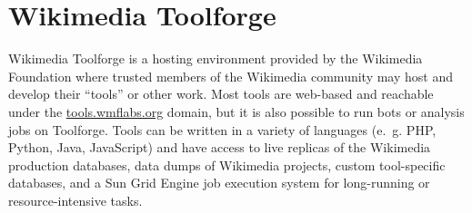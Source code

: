 \section{Wikimedia Toolforge}
\label{sec:Background:Toolforge}

Wikimedia Toolforge is a hosting environment provided by the Wikimedia Foundation
where trusted members of the \gls{Wikimedia} community may host and develop their “tools” or other work.
Most tools are web-based and reachable under the \href{https://tools.wmflabs.org/}{tools.wmflabs.org} domain,
but it is also possible to run bots or analysis jobs on Toolforge.
Tools can be written in a variety of languages
(e.~g. PHP, Python, Java, \gls{JavaScript})
and have access to live replicas of the \gls{Wikimedia} production databases,
data dumps of \gls{Wikimedia} projects,
custom tool-specific databases,
and a Sun Grid Engine job execution system for long-running or resource-intensive tasks.
